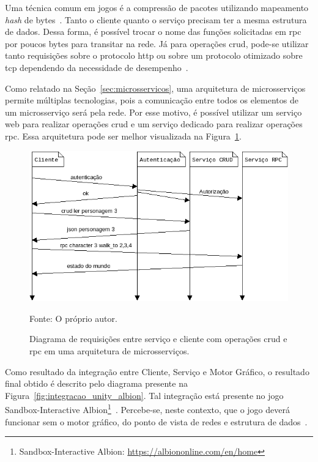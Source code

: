 Uma técnica comum em jogos é a compressão de pacotes utilizando mapeamento \textit{hash} de bytes~\cite{LeckyThompson2008Nov}.
%
Tanto o cliente quanto o serviço precisam ter a mesma estrutura de dados.
%
Dessa forma, é possível trocar o nome das funções solicitadas em \ac{rpc} por poucos bytes para transitar na rede.
%
Já para operações \ac{crud}, pode-se utilizar tanto requisições sobre o protocolo \ac{http} ou sobre um protocolo otimizado sobre \ac{tcp} dependendo da necessidade de desempenho~\cite{LeckyThompson2008Nov}.

Como relatado na Seção~\ref{sec:microsservicos}, uma arquitetura de microsserviços permite múltiplas tecnologias, pois a comunicação entre todos os elementos de um microsserviço será pela rede.
%
Por esse motivo, é possível utilizar um serviço web para realizar operações \ac{crud} e um serviço dedicado para realizar operações \ac{rpc}.
%
Essa arquitetura pode ser melhor visualizada na Figura~\ref{fig:network_crud_rpc_micro}.



\begin{figure}[htb!]
\caption{Diagrama de requisições entre serviço e cliente com operações \ac{crud} e \ac{rpc} em uma arquitetura de microsserviços.}
\label{fig:network_crud_rpc_micro}
\includegraphics[height=6.5cm]{img/cap2/network_rpc_crud_micro.png}
\centering

Fonte: O próprio autor.
\end{figure}



Como resultado da integração entre Cliente, Serviço e Motor Gráfico, o resultado final obtido é descrito pelo diagrama presente na Figura~\ref{fig:integracao_unity_albion}.
%
Tal integração está presente no jogo Sandbox-Interactive Albion\footnote{Sandbox-Interactive Albion: \url{https://albiononline.com/en/home}}~\cite{albion_online_unite}.
%
Percebe-se, neste contexto, que o jogo deverá funcionar sem o motor gráfico, do ponto de vista de redes e estrutura de dados~\cite{albion_online_unite}.


